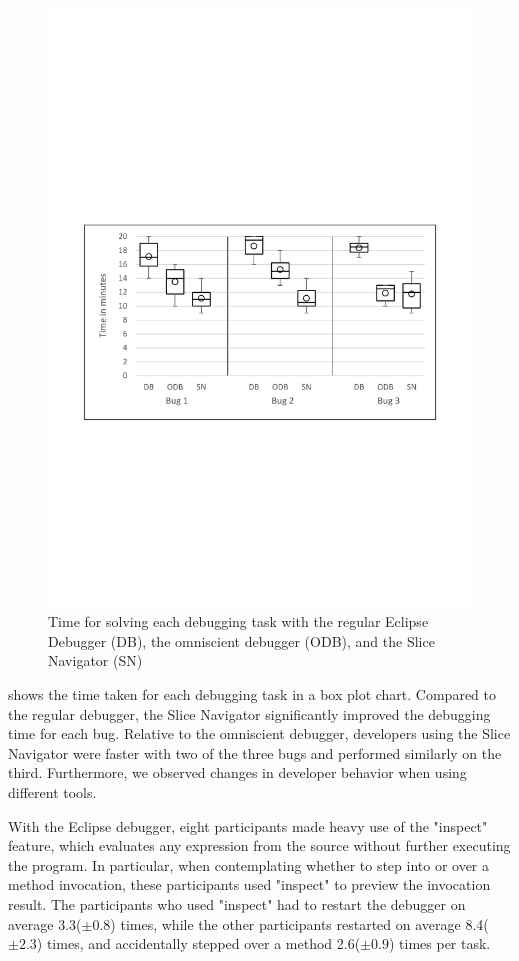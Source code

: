\begin{figure}
	\centering
		\includegraphics[width=\linewidth, clip, trim={20mm 104mm 20mm 114mm}]{img/chart-times2.pdf}
	\caption{Time for solving each debugging task with the regular Eclipse Debugger (DB), the omniscient debugger (ODB), and the Slice Navigator (SN)}
	\label{fig:charttimes}
\end{figure}

 shows the time taken for each debugging task in a box plot chart.
Compared to the regular debugger, the Slice Navigator significantly improved the debugging time for each bug.
Relative to the omniscient debugger, developers using the Slice Navigator were faster with two of the three bugs and performed similarly on the third.
Furthermore, we observed changes in developer behavior when using different tools.

With the Eclipse debugger, eight participants made heavy use of the "inspect" feature, which evaluates any expression from the source without further executing the program.
In particular, when contemplating whether to step into or over a method invocation, these participants used "inspect" to preview the invocation result.
The participants who used "inspect" had to restart the debugger on average 3.3($\pm0.8$) times, while the other participants restarted on average 8.4($\pm2.3$) times, and accidentally stepped over a method 2.6($\pm0.9$) times per task.

